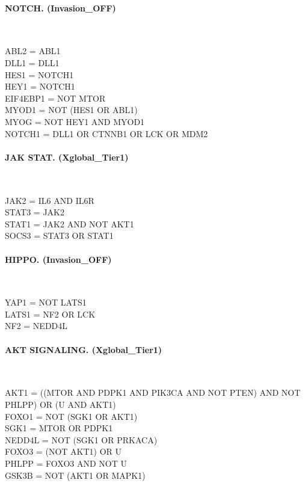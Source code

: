 \paragraph{NOTCH. (Invasion\_OFF)}\mbox{}\\
\begin{flushleft}\ttfamily\small
ABL2 = ABL1\\
DLL1 = DLL1\\
HES1 = NOTCH1\\
HEY1 = NOTCH1\\
EIF4EBP1 = NOT MTOR\\
MYOD1 = NOT (HES1 OR ABL1)\\
MYOG = NOT HEY1 AND MYOD1\\
NOTCH1 = DLL1 OR CTNNB1 OR LCK OR MDM2\\
\end{flushleft}

\paragraph{JAK STAT. (Xglobal\_Tier1)}\mbox{}\\
\begin{flushleft}\ttfamily\small
JAK2 = IL6 AND IL6R\\
STAT3 = JAK2\\
STAT1 = JAK2 AND NOT AKT1\\
SOCS3 = STAT3 OR STAT1\\
\end{flushleft}

\paragraph{HIPPO. (Invasion\_OFF)}\mbox{}\\
\begin{flushleft}\ttfamily\small
YAP1 = NOT LATS1\\
LATS1 = NF2 OR LCK\\
NF2 = NEDD4L\\
\end{flushleft}

\paragraph{AKT SIGNALING. (Xglobal\_Tier1)}\mbox{}\\
\begin{flushleft}\ttfamily\small
AKT1 = ((MTOR AND PDPK1 AND PIK3CA AND NOT PTEN) AND NOT PHLPP) OR (U AND AKT1)\\
FOXO1 = NOT (SGK1 OR AKT1)\\
SGK1 = MTOR OR PDPK1\\
NEDD4L = NOT (SGK1 OR PRKACA)\\
FOXO3 = (NOT AKT1) OR U\\
PHLPP = FOXO3 AND NOT U\\
GSK3B = NOT (AKT1 OR MAPK1)\\
\end{flushleft}

